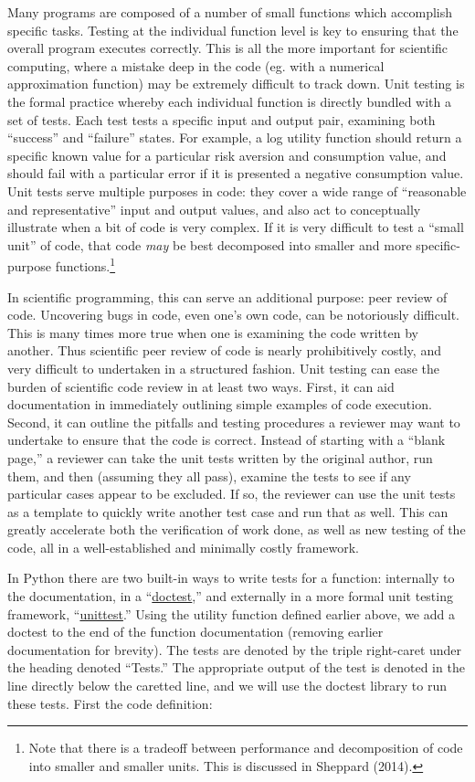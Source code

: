 \documentclass[]{article}
\begin{document}
Many programs are composed of a number of small functions which
accomplish specific tasks. Testing at the individual function level is
key to ensuring that the overall program executes correctly. This is all
the more important for scientific computing, where a mistake deep in the
code (eg. with a numerical approximation function) may be extremely
difficult to track down. Unit testing is the formal practice whereby
each individual function is directly bundled with a set of tests. Each
test tests a specific input and output pair, examining both ``success''
and ``failure'' states. For example, a log utility function should
return a specific known value for a particular risk aversion and
consumption value, and should fail with a particular error if it is
presented a negative consumption value. Unit tests serve multiple
purposes in code: they cover a wide range of ``reasonable and
representative'' input and output values, and also act to conceptually
illustrate when a bit of code is very complex. If it is very difficult
to test a ``small unit'' of code, that code \emph{may} be best
decomposed into smaller and more specific-purpose functions.\footnote{Note
  that there is a tradeoff between performance and decomposition of code
  into smaller and smaller units. This is discussed in Sheppard
  (2014)\href{REF}{}.}

In scientific programming, this can serve an additional purpose: peer
review of code. Uncovering bugs in code, even one's own code, can be
notoriously difficult. This is many times more true when one is
examining the code written by another. Thus scientific peer review of
code is nearly prohibitively costly, and very difficult to undertaken in
a structured fashion. Unit testing can ease the burden of scientific
code review in at least two ways. First, it can aid documentation in
immediately outlining simple examples of code execution. Second, it can
outline the pitfalls and testing procedures a reviewer may want to
undertake to ensure that the code is correct. Instead of starting with a
``blank page,'' a reviewer can take the unit tests written by the
original author, run them, and then (assuming they all pass), examine
the tests to see if any particular cases appear to be excluded. If so,
the reviewer can use the unit tests as a template to quickly write
another test case and run that as well. This can greatly accelerate both
the verification of work done, as well as new testing of the code, all
in a well-established and minimally costly framework.

In Python there are two built-in ways to write tests for a function:
internally to the documentation, in a
``\href{https://docs.python.org/2/library/doctest.html}{doctest},'' and
externally in a more formal unit testing framework,
``\href{https://docs.python.org/2/library/unittest.html}{unittest}.''
Using the utility function defined earlier above, we add a doctest to
the end of the function documentation (removing earlier documentation
for brevity). The tests are denoted by the triple right-caret under the
heading denoted ``Tests.'' The appropriate output of the test is denoted
in the line directly below the caretted line, and we will use the
doctest library to run these tests. First the code definition:
\end{document}
